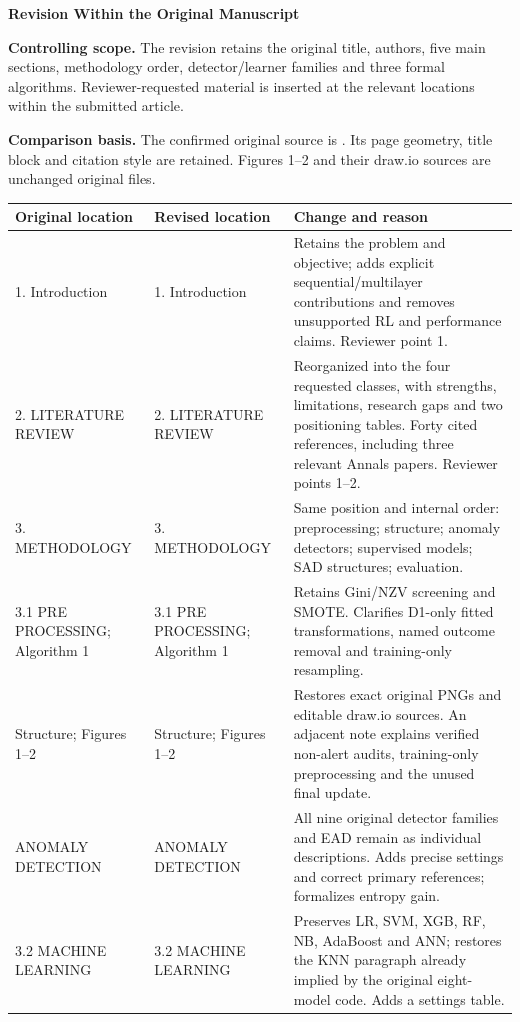 \documentclass[11pt,a4paper]{article}
\begin{document}
\begin{center}{\LARGE\bfseries Revision Within the Original Manuscript}\end{center}
\textbf{Controlling scope.} The revision retains the original title, authors,
five main sections, methodology order, detector/learner families and three
formal algorithms. Reviewer-requested material is inserted at the relevant
locations within the submitted article.

\textbf{Comparison basis.} The confirmed original source is
. Its page geometry,
title block and citation style are retained. Figures 1--2 and their draw.io
sources are unchanged original files.

\small
\begin{longtable}{p{3.3cm}p{3.7cm}p{7.1cm}}
\toprule Original location & Revised location & Change and reason\\\midrule\endhead
1. Introduction & 1. Introduction & Retains the problem and objective; adds explicit sequential/multilayer contributions and removes unsupported RL and performance claims. Reviewer point 1.\\
2. LITERATURE REVIEW & 2. LITERATURE REVIEW & Reorganized into the four requested classes, with strengths, limitations, research gaps and two positioning tables. Forty cited references, including three relevant Annals papers. Reviewer points 1--2.\\
3. METHODOLOGY & 3. METHODOLOGY & Same position and internal order: preprocessing; structure; anomaly detectors; supervised models; SAD structures; evaluation.\\
3.1 PRE PROCESSING; Algorithm 1 & 3.1 PRE PROCESSING; Algorithm 1 & Retains Gini/NZV screening and SMOTE. Clarifies D1-only fitted transformations, named outcome removal and training-only resampling.\\
Structure; Figures 1--2 & Structure; Figures 1--2 & Restores exact original PNGs and editable draw.io sources. An adjacent note explains verified non-alert audits, training-only preprocessing and the unused final update.\\
ANOMALY DETECTION & ANOMALY DETECTION & All nine original detector families and EAD remain as individual descriptions. Adds precise settings and correct primary references; formalizes entropy gain.\\
3.2 MACHINE LEARNING & 3.2 MACHINE LEARNING & Preserves LR, SVM, XGB, RF, NB, AdaBoost and ANN; restores the KNN paragraph already implied by the original eight-model code. Adds a settings table.\\

\end{longtable}
\end{document}

